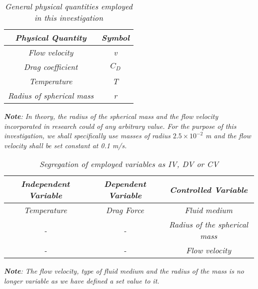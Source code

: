 \begin{table}[H]
    \centering
        \begin{tabular}{|c|c|}
        \hline
        \hline
        \textit{Physical Quantity} & \textit{Symbol} \\
        \hline
        \hline
        \textit{Flow velocity} & \textit{v} \\
        \hline
        \textit{Drag coefficient} & \textit{$C_D$} \\
		\hline        
        \textit{Temperature} & \textit{T} \\
        \hline
        \textit{Radius of spherical mass} & \textit{r} \\
        \hline
        \hline
        \end{tabular}
    \caption{\textit{General physical quantities employed in this investigation}}
\end{table}

\textit{\textbf{Note}: In theory, the radius of the spherical mass and the flow velocity  incorporated in research could of any arbitrary value. For the purpose of this investigation, we shall specifically use masses of radius $2.5\times10^{-2}$ m and the flow velocity shall be set constant at 0.1 m/s.}

\begin{table}[H]
    \centering
        \begin{tabular}{|c|c|c|}
        \hline
        \hline
        \textit{Independent Variable} & \textit{Dependent Variable} & \textit{Controlled Variable} \\
        \hline
        \hline
        \textit{Temperature} & \textit{Drag Force} & \textit{Fluid medium} \\
        \hline
        \textit{-} & \textit{-} & \textit{Radius of the spherical mass} \\
        \hline
        \textit{-} & \textit{-} & \textit{Flow velocity} \\
        \hline
        \hline
        \end{tabular}
    \caption{\textit{Segregation of employed variables as IV, DV or CV}}
\end{table}

\textit{\textbf{Note}: The flow velocity, type of fluid medium and the radius of the mass is no longer variable as we have defined a set value to it.}


